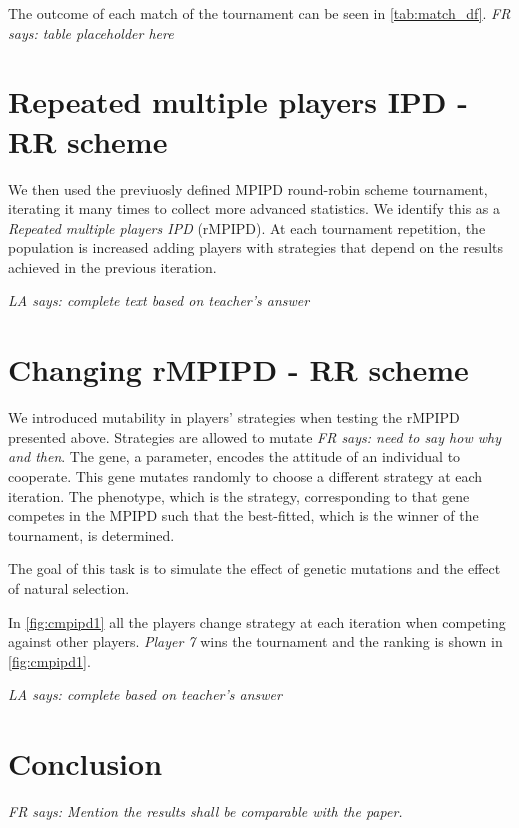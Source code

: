 \documentclass[journal,a4paper,10pt,twoside]{IEEEtran} %
\newcommand{\FR}[1]{\textit{\color{ForestGreen}FR says: #1}}
\newcommand{\LA}[1]{\textit{\color{orange}LA says: #1}}
\begin{document}
The outcome of each match of the tournament can be seen in \autoref{tab:match_df}. \FR{table placeholder here}

\section{Repeated multiple players IPD - RR scheme} \label{s:rIPDMP}
We then used the previuosly defined MPIPD round-robin scheme tournament, iterating it many times to collect more advanced statistics.
We identify this as a \textit{Repeated multiple players IPD} (rMPIPD).
At each tournament repetition, the population is increased adding players with strategies that depend on the results achieved in the previous iteration.

\LA{complete text based on teacher's answer}


\section{Changing rMPIPD - RR scheme} \label{s:crIPDMP}
We introduced mutability in players' strategies when testing the rMPIPD presented above.
Strategies are allowed to mutate \FR{need to say how why and then}.
The gene, a parameter, encodes the attitude of an individual to cooperate. This gene mutates randomly to choose a different strategy at each iteration. The phenotype, which is the strategy, corresponding to that gene competes in the MPIPD such that the best-fitted, which is the winner of the tournament, is determined.

The goal of this task is to simulate the effect of genetic mutations and the effect of natural selection.

In \autoref{fig:cmpipd1} all the players change strategy at each iteration when competing against other players. \textit{Player 7} wins the tournament and the ranking is shown in \autoref{fig:cmpipd1}.

\LA{complete based on teacher's answer}


\section{Conclusion} \label{s:conc}

\FR{Mention the results shall be comparable with the paper.}

\balance
%
%
\end{document}
